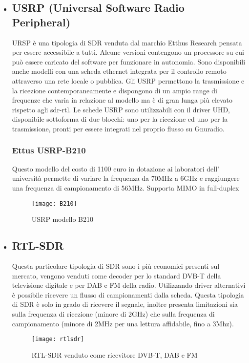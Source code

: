 \begin{itemize}
\begin{figure}[h]
\begin{minipage}[b]{.4\columnwidth}
	\end{minipage}\hfill
\end{figure}
\newpage
\item \subsection{USRP (Universal Software Radio Peripheral)} URSP è una tipologia di SDR venduta dal marchio Etthus Research pensata per essere accessibile a tutti. Alcune versioni contengono un processore su cui può essere caricato del software per funzionare in autonomia. Sono disponibili anche modelli con una scheda ethernet integrata per il controllo remoto attraverso una rete locale o pubblica. Gli USRP permettono la trasmissione e la ricezione contemporaneamente e dispongono di un ampio range di frequenze che varia in relazione al modello ma è di gran lunga più elevato rispetto agli sdr-rtl. Le schede USRP sono utilizzabili con il driver UHD, disponibile sottoforma di due blocchi: uno per la ricezione ed uno per la trasmissione, pronti per essere integrati nel proprio flusso su Gnuradio.
\subsubsection{Ettus USRP-B210}
Questo modello del costo di 1100 euro in dotazione ai laboratori dell' università permette di variare la frequenza da 70MHz a 6GHz e raggiungere una frequenza di campionamento di 56MHz. Supporta MIMO in full-duplex
\begin{figure}[h]
	\centering
	\texttt{[image: B210]}
	\caption{USRP modello B210\cite{b210}}\label{fig:1}
\end{figure}

\item \subsection{RTL-SDR} Questa particolare tipologia di SDR sono i più economici presenti sul mercato, vengono venduti come decoder per lo standard DVB-T della televisione digitale e per DAB e FM della radio. Utilizzando driver alternativi è possibile ricevere un flusso di campionamenti dalla scheda. Questa tipologia di SDR è solo in grado di ricevere il segnale, inoltre presenta limitazioni sia sulla frequenza di ricezione (minore di 2GHz) che sulla frequenza di campionamento (minore di 2MHz per una lettura affidabile, fino a 3Mhz).
\begin{figure}[h]
	\centering
	\texttt{[image: rtlsdr]}
	\caption{RTL-SDR venduto come ricevitore DVB-T, DAB e FM\cite{rtlsdr}}\label{fig:1}
\end{figure}


\end{itemize}
